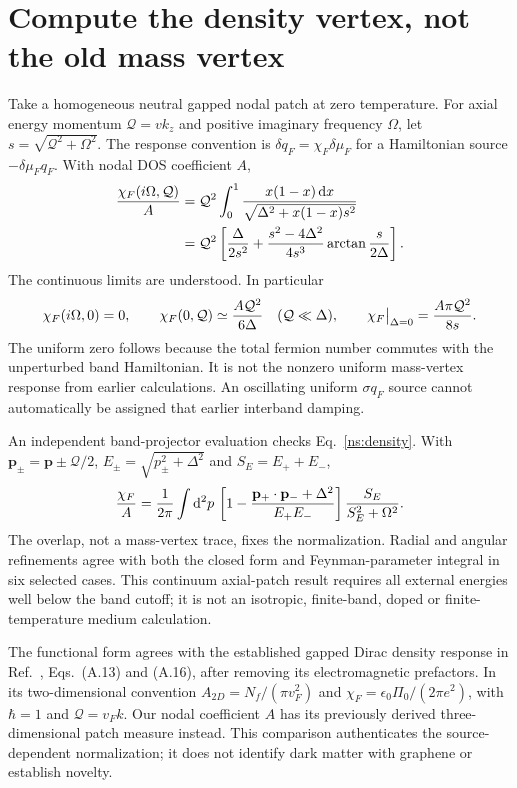 \documentclass[11pt]{article}
\newcommand{\dd}{\mathrm d}
\begin{document}
\section{Compute the density vertex, not the old mass vertex}
Take a homogeneous neutral gapped nodal patch at zero temperature.
For axial energy momentum $\mathcal Q=v k_z$ and positive imaginary
frequency $\Omega$, let $s=\sqrt{\mathcal Q^2+\Omega^2}$.
The response convention is $\delta q_F=\chi_F\delta\mu_F$ for a
Hamiltonian source $-\delta\mu_F q_F$. With nodal DOS coefficient $A$,
\begin{align}
 {\chi_F(i\Omega,\mathcal Q)\over A}
 &=\mathcal Q^2\int_0^1
       {x(1-x)\,\dd x\over\sqrt{\Delta^2+x(1-x)s^2}}\\
 &=\mathcal Q^2\left[{\Delta\over2s^2}
       +{s^2-4\Delta^2\over4s^3}
                       \arctan{s\over2\Delta}\right].
 \label{ns:density}
\end{align}
The continuous limits are understood. In particular
\begin{equation}
 \chi_F(i\Omega,0)=0,\qquad
 \chi_F(0,\mathcal Q)\simeq {A\mathcal Q^2\over6\Delta}
 \quad(\mathcal Q\ll\Delta),\qquad
 \chi_F\big|_{\Delta=0}={A\pi\mathcal Q^2\over8s}.
\end{equation}
The uniform zero follows because the total fermion number commutes with
the unperturbed band Hamiltonian. It is not the nonzero uniform mass-vertex
response from earlier calculations. An oscillating uniform $\sigma q_F$
source cannot automatically be assigned that earlier interband damping.

An independent band-projector evaluation checks Eq.~\eqref{ns:density}.
With $\mathbf p_\pm=\mathbf p\pm\boldsymbol{\mathcal Q}/2$,
$E_\pm=\sqrt{p_\pm^2+\Delta^2}$ and $S_E=E_++E_-$,
\begin{equation}
 {\chi_F\over A}={1\over2\pi}\int\dd^2p\,
 \left[1-{\mathbf p_+\cdot\mathbf p_-+\Delta^2\over E_+E_-}\right]
 {S_E\over S_E^2+\Omega^2}.
\end{equation}
The overlap, not a mass-vertex trace, fixes the normalization. Radial and
angular refinements agree with both the closed form and Feynman-parameter
integral in six selected cases. This continuum axial-patch result requires
all external energies well below the band cutoff; it is not an isotropic,
finite-band, doped or finite-temperature medium calculation.

The functional form agrees with the established gapped Dirac density
response in Ref.~\cite{ns:pyatkovskiy}, Eqs.~(A.13) and (A.16), after
removing its electromagnetic prefactors. In its two-dimensional convention
$A_{2D}=N_f/(\pi v_F^2)$ and
$\chi_F=\epsilon_0\Pi_0/(2\pi e^2)$, with $\hbar=1$ and
$\mathcal Q=v_Fk$. Our nodal coefficient $A$ has its previously derived
three-dimensional patch measure instead. This comparison authenticates
the source-dependent normalization; it does not identify dark matter with
graphene or establish novelty.
\end{document}
